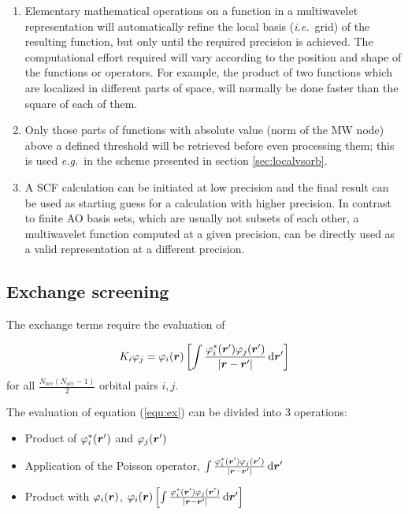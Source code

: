 \documentclass[journal=jctcce, manuscript=article]{achemso}
\begin{document}
\begin{enumerate}
    \item Elementary mathematical operations on a function in a multiwavelet representation will automatically refine the local basis (\emph{i.e.}~grid) of the resulting function, but only until the required precision is achieved. The computational effort required will vary according to the position and shape of the functions or operators. For example, the product of two functions which are localized in different parts of space, will normally be done faster than the square of each of them.
    \item Only those parts of functions with absolute value (norm of the \ac{MW} node) above a defined threshold will be retrieved before even processing them; this is used \emph{e.g.}~in the scheme presented in section \ref{sec:localvsorb}.
    \item A \ac{SCF} calculation can be initiated at low precision and the final result can be used as starting guess for a calculation with higher precision. In contrast to finite \ac{AO} basis sets, which are usually not subsets of each other, a multiwavelet function computed at a given precision, can be directly used as a valid representation at a different precision.
\end{enumerate}

\subsection{Exchange screening}
\label{Xscreen}

The exchange terms require the evaluation of

\begin{equation}
\label{equ:ex}
  K_i \varphi_j = \varphi_i(\boldsymbol{r}) 
  \left[
  \int \frac{\varphi^*_i(\boldsymbol{r}')\varphi_j(\boldsymbol{r}')}{|\boldsymbol{r}-\boldsymbol{r}'|} \, \mathrm{d}\boldsymbol{r}'
  \right]
\end{equation}
 for all $\frac{N_{\mathrm{occ}}(N_{\mathrm{occ}}-1)}{2}$ orbital pairs $i,j$.

The evaluation of equation (\ref{equ:ex}) can be divided into 3 operations:
\begin{itemize}
\item Product of $\varphi^*_i(\boldsymbol{r}')$ and $\varphi_j(\boldsymbol{r}')$
\item Application of the Poisson operator, $\int \frac{\varphi^*_i(\boldsymbol{r}')\varphi_j(\boldsymbol{r}')}{|\boldsymbol{r}-\boldsymbol{r}'|} \, \mathrm{d}\boldsymbol{r}'$
\item Product with $\varphi_i(\boldsymbol{r})$, $\varphi_i(\boldsymbol{r}) \left[\int \frac{\varphi^*_i(\boldsymbol{r}')\varphi_j(\boldsymbol{r}')}{|\boldsymbol{r}-\boldsymbol{r}'|} \, \mathrm{d}\boldsymbol{r}'\right]$
\end{itemize}
\end{document}

